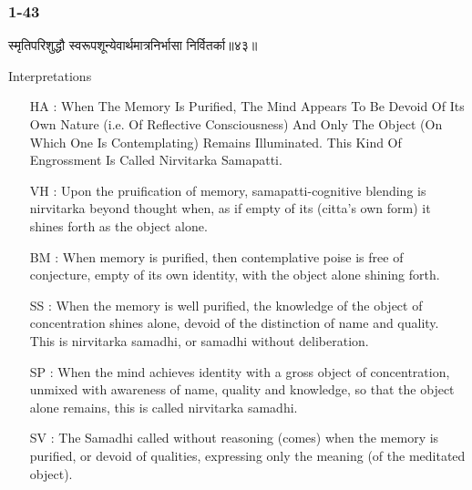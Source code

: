 \begin{frame}[fragile]\frametitle{1-43}
\begin{sanskrit}
स्मृतिपरिशुद्धौ स्वरूपशून्येवार्थमात्रनिर्भासा निर्वितर्का॥४३॥
\end{sanskrit}

Interpretations
\begin{itemize}
\item [HA]: When The Memory Is Purified, The Mind Appears To Be Devoid Of Its Own Nature (i.e. Of Reflective Consciousness) And Only The Object (On Which One Is Contemplating) Remains Illuminated. This Kind Of Engrossment Is Called Nirvitarka Samapatti.
\item [VH]: Upon the pruification of memory, samapatti-cognitive blending is nirvitarka beyond thought when, as if empty of its (citta’s own form) it shines forth as the object alone.
\item [BM]: When memory is purified, then contemplative poise is free of conjecture, empty of its own identity, with the object alone shining forth.
\item [SS]: When the memory is well purified, the knowledge of the object of concentration shines alone, devoid of the distinction of name and quality. This is nirvitarka samadhi, or samadhi without deliberation.
\item [SP]: When the mind achieves identity with a gross object of concentration, unmixed with awareness of name, quality and knowledge, so that the object alone remains, this is called nirvitarka samadhi.
\item [SV]: The Samadhi called without reasoning (comes) when the memory is purified, or devoid of qualities, expressing only the meaning (of the meditated object). 
\end{itemize}
	
\end{frame}



